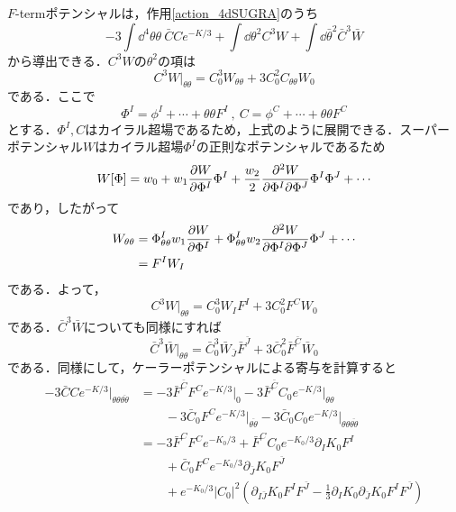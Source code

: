 \documentclass[a4paper,uplatex,dvipdfmx,10pt]{jsarticle}
\theoremstyle{definition}
\begin{document}
$F$-termポテンシャルは，作用\eqref{action_4dSUGRA}のうち
\begin{equation}
   -3
   \int\dd^4\theta\theta\ 
   \bar{C}Ce^{-K/3}
   +
   \int\dd\theta^2 C^3 W
   +
   \int\dd\bar{\theta}^2 \bar{C}^3 \bar{W}
   \nonumber
\end{equation}
から導出できる．$C^3 W$の$\theta^2$の項は
\begin{equation}
   C^3 W
   \left.\right|_{\theta\theta}
   =
   C_{0}^3 W_{\theta\theta}
   +
   3C^{2}_{0}C_{\theta\theta}
   W_{0}
   \label{eqn_append3_1}
\end{equation}
である．ここで
\begin{equation}
   \Phi^{I}
   =
   \phi^{I}+\cdots+\theta\theta F^{I}
   \ ,\ 
   C
   =
   \phi^{C}+\cdots+\theta\theta F^{C}
   \nonumber
\end{equation}
とする．$\Phi^{I},C$はカイラル超場であるため，上式のように展開できる．スーパーポテンシャル$W$はカイラル超場$\Phi^{I}$の正則なポテンシャルであるため
\begin{equation}
   W[\Phi]
   =
   w_{0}+w_{1}\pdv{W}{\Phi^{I}}\Phi^{I}+\frac{w_{2}}{2}\pdv{W}{\Phi^{I}}{\Phi^{J}}\Phi^{I}\Phi^{J}+\cdots
   \nonumber
\end{equation}
であり，したがって
\begin{align}
   W_{\theta\theta}
   &=
   \Phi^{I}_{\theta\theta}w_{1}\pdv{W}{\Phi^{I}}
   +
   \Phi^{I}_{\theta\theta}w_{2}\pdv{W}{\Phi^{I}}{\Phi^{J}}\Phi^{J}+\cdots
   \nonumber
   \\
   &=
   F^{I}W_{I}
   \nonumber
\end{align}
である．よって，
\begin{equation}
   C^{3}W\left.\right|_{\theta\theta}
   =
   C_{0}^3W_{I}F^{I}
   +
   3C_{0}^{2}F^{C}W_{0}
   \label{eqn_append3_2}
\end{equation}
である．$\bar{C}^3 \bar{W}$についても同様にすれば
\begin{equation}
   \bar{C}^3 \bar{W}\left.\right|_{\theta\theta}
   =
   \bar{C}_{0}^{3}\bar{W}_{\bar{J}}\bar{F}^{\bar{J}}
   +
   3\bar{C}_{0}^{2}\bar{F}^{\bar{C}}\bar{W}_{0}
   \label{eqn_append3_3}
\end{equation}
である．同様にして，ケーラーポテンシャルによる寄与を計算すると
\begin{align}
   -3\bar{C}Ce^{-K/3}\left.\right|_{\theta\theta\overline{\theta\theta}}
   &=
   -3\bar{F}^{\bar{C}}F^{C}e^{-K/3}\left.\right|_{0}
   -
   3\bar{F}^{\bar{C}}C_{0}e^{-K/3}\left.\right|_{\theta\theta}
   \nonumber
   \\
   &\qquad
   -3\bar{C}_{0}F^{C}e^{-K/3}\left.\right|_{\overline{\theta\theta}}
   -
   3\bar{C}_{0}C_{0}e^{-K/3}\left.\right|_{\theta\theta\overline{\theta\theta}}
   \nonumber
   \\
   &=  
   -3\bar{F}^{C}F^{C}e^{-K_{0}/3}
   +
   \bar{F}^{C}C_{0}e^{-K_{0}/3}\partial_{I}K_{0}F^{I}
   \nonumber
   \\
   &\qquad
   +
   \bar{C}_{0}F^{C}e^{-K_{0}/3}\partial_{\bar{J}}K_{0}F^{\bar{J}}
   \nonumber
   \\
   &\qquad
   +
   e^{-K_{0}/3}|C_{0}|^2
   \left(
       \partial_{I\bar{J}}K_{0}F^{I}F^{\bar{J}}
       -
       \frac{1}{3}\partial_{I}K_{0}\partial_{\bar{J}}K_{0}F^{I}F^{\bar{J}}
   \right)
   \label{eqn_append3_4}
\end{align}
\end{document}

